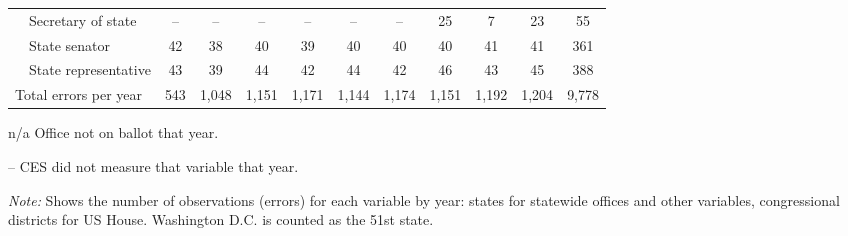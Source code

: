 \begin{table}[!htbp]
{\begin{threeparttable}
\begin{tabular}{lcccccccccc}
~~Secretary of state & -- & -- & -- & -- & -- & -- & 25 & 7 & 23 & 55 \\
~~State senator & 42 & 38 & 40 & 39 & 40 & 40 & 40 & 41 & 41 & 361 \\
~~State representative & 43 & 39 & 44 & 42 & 44 & 42 & 46 & 43 & 45 & 388 \\
\midrule
Total errors per year & 543 & 1,048 & 1,151 & 1,171 & 1,144 & 1,174 & 1,151 & 1,192 & 1,204 & 9,778 \\
\bottomrule
\end{tabular}
\begin{tablenotes}
\footnotesize
\item n/a Office not on ballot that year.
\item -- CES did not measure that variable that year.
\item \textit{Note:} Shows the number of observations (errors) for each variable by year: states for statewide offices and other variables, congressional districts for US House. Washington D.C. is counted as the 51st state.
\end{tablenotes}
\end{threeparttable}%
}
\end{table}